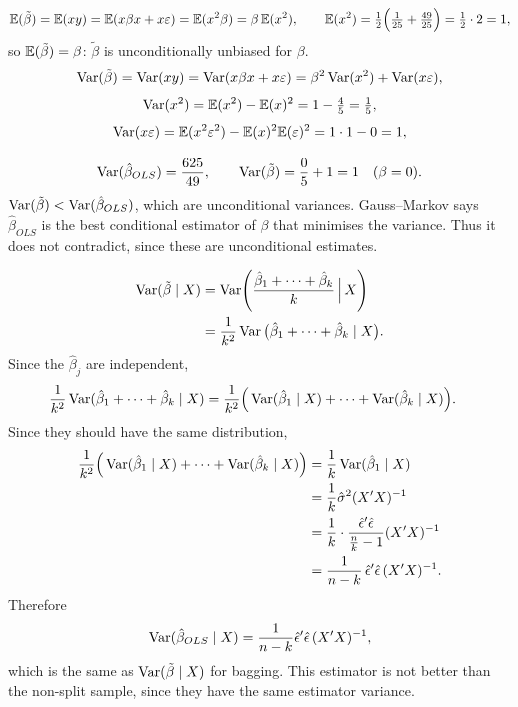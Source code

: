 \documentclass[11pt]{article}
\begin{document}
\[
\mathbb{E}(\tilde\beta)=\mathbb{E}(xy)=\mathbb{E}(x\beta x+x\varepsilon)=\mathbb{E}(x^2\beta)=\beta\,\mathbb{E}(x^2),
\qquad
\mathbb{E}(x^2)=\tfrac12\Big(\tfrac1{25}+\tfrac{49}{25}\Big)=\tfrac12\cdot2=1,
\]
so $\mathbb{E}(\tilde\beta)=\beta$: $\tilde\beta$ is unconditionally unbiased for $\beta$.
\[
\operatorname{Var}(\tilde\beta)=\operatorname{Var}(xy)=\operatorname{Var}(x\beta x+x\varepsilon)=\beta^2\operatorname{Var}(x^2)+\operatorname{Var}(x\varepsilon),
\]
\[
\operatorname{Var}(x^2)=\mathbb{E}(x^2)-\mathbb{E}(x)^2=1-\tfrac45=\tfrac15,
\]
\[
\operatorname{Var}(x\varepsilon)=\mathbb{E}(x^2\varepsilon^2)-\mathbb{E}(x)^2\mathbb{E}(\varepsilon)^2=1\cdot1-0=1,
\]

\[
\operatorname{Var}(\hat\beta_{OLS})=\frac{625}{49},\qquad
\operatorname{Var}(\tilde\beta)=\frac05+1=1\quad(\beta=0).
\]
$\operatorname{Var}(\tilde\beta)<\operatorname{Var}(\hat\beta_{OLS})$, which are unconditional variances. Gauss--Markov says $\hat\beta_{OLS}$ is the best conditional estimator of $\beta$ that minimises the variance. Thus it does not contradict, since these are unconditional estimates.

\[
\begin{aligned}
\operatorname{Var}(\tilde\beta\mid X)&=\operatorname{Var}\!\left(\frac{\hat\beta_1+\dots+\hat\beta_k}{k}\,\Big|\,X\right)\\
&=\frac1{k^2}\operatorname{Var}\big(\hat\beta_1+\dots+\hat\beta_k\mid X\big).
\end{aligned}
\]
Since the $\hat\beta_j$ are independent,
\[
\begin{aligned}
\frac1{k^2}\operatorname{Var}(\hat\beta_1+\dots+\hat\beta_k\mid X)
&=\frac1{k^2}\Big(\operatorname{Var}(\hat\beta_1\mid X)+\dots+\operatorname{Var}(\hat\beta_k\mid X)\Big).
\end{aligned}
\]
Since they should have the same distribution,
\[
\begin{aligned}
\frac1{k^2}\Big(\operatorname{Var}(\hat\beta_1\mid X)+\dots+\operatorname{Var}(\hat\beta_k\mid X)\Big)
&=\frac1k\operatorname{Var}(\hat\beta_1\mid X)\\
&=\frac1k\hat\sigma^2(X'X)^{-1}\\
&=\frac1k\cdot\frac{\hat\epsilon'\hat\epsilon}{\frac nk-1}(X'X)^{-1}\\
&=\frac1{n-k}\,\hat\epsilon'\hat\epsilon\,(X'X)^{-1}.
\end{aligned}
\]
Therefore
\[
\operatorname{Var}(\hat\beta_{OLS}\mid X)=\frac1{n-k}\hat\epsilon'\hat\epsilon\,(X'X)^{-1},
\]
which is the same as $\operatorname{Var}(\tilde\beta\mid X)$ for bagging. This estimator is not better than the non-split sample, since they have the same estimator variance.

\end{document}
